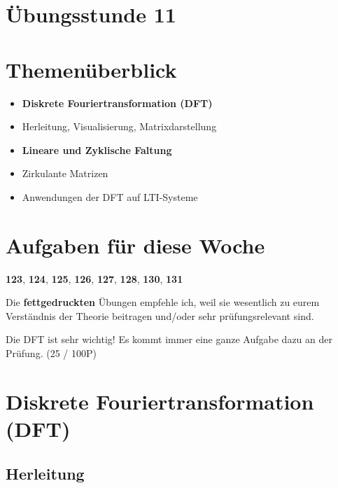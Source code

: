 \documentclass[11pt]{article}
\begin{document}
\thispagestyle{firstpage}

\setlength{\headheight}{1 \baselineskip}  %
\setlength{\parindent}{0pt}  %
\setlength{\parskip}{\baselineskip}  %

\vspace*{-5px}
\section*{Übungsstunde 11}

\section*{Themenüberblick}
\begin{itemize}
    \item \textbf{Diskrete Fouriertransformation (DFT)}
    \item[] Herleitung, Visualisierung, Matrixdarstellung
    \item \textbf{Lineare und Zyklische Faltung}
    \item[] Zirkulante Matrizen
    \item[] Anwendungen der DFT auf LTI-Systeme
\end{itemize}

\section*{Aufgaben für diese Woche}
\vspace{-0.5cm}

\textbf{123}, \textbf{124}, \textbf{125}, \textbf{126}, \textbf{127}, \textbf{128}, \textbf{130}, \textbf{131}\\
\vspace{-0.5cm}

Die \textbf{fettgedruckten} Übungen empfehle ich, weil sie wesentlich zu eurem Verständnis der Theorie beitragen und/oder sehr prüfungsrelevant sind.

Die DFT ist \textcolor{myred}{sehr wichtig}! Es kommt immer eine ganze Aufgabe dazu an der Prüfung. (25 / 100P)

\vfill \null
\pagebreak

\section*{Diskrete Fouriertransformation (DFT)}
\vspace*{-0.5cm}
\subsection*{Herleitung}
\vspace*{-0.5cm}
\end{document}
